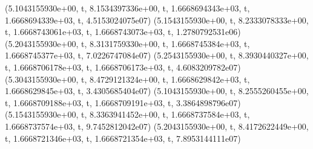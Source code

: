 \documentclass[letterpaper,10pt,english]{sphinxmanual}
\begin{document}
\begin{sphinxVerbatim}[commandchars=\\\{\}]
(\PYGZsq{}5.1043155930e+00\PYGZsq{}, \PYGZsq{}\PYGZbs{}t\PYGZsq{}, \PYGZsq{}8.1534397336e+00\PYGZsq{}, \PYGZsq{}\PYGZbs{}t\PYGZsq{}, \PYGZsq{}\PYGZhy{}1.6668694343e+03\PYGZsq{}, \PYGZsq{}\PYGZbs{}t\PYGZsq{}, \PYGZsq{}\PYGZhy{}1.6668694339e+03\PYGZsq{}, \PYGZsq{}\PYGZbs{}t\PYGZsq{}, \PYGZsq{}\PYGZhy{}4.5153024075e\PYGZhy{}07\PYGZsq{})
(\PYGZsq{}5.1543155930e+00\PYGZsq{}, \PYGZsq{}\PYGZbs{}t\PYGZsq{}, \PYGZsq{}8.2333078333e+00\PYGZsq{}, \PYGZsq{}\PYGZbs{}t\PYGZsq{}, \PYGZsq{}\PYGZhy{}1.6668743061e+03\PYGZsq{}, \PYGZsq{}\PYGZbs{}t\PYGZsq{}, \PYGZsq{}\PYGZhy{}1.6668743073e+03\PYGZsq{}, \PYGZsq{}\PYGZbs{}t\PYGZsq{}, \PYGZsq{}1.2780792531e\PYGZhy{}06\PYGZsq{})
(\PYGZsq{}5.2043155930e+00\PYGZsq{}, \PYGZsq{}\PYGZbs{}t\PYGZsq{}, \PYGZsq{}8.3131759330e+00\PYGZsq{}, \PYGZsq{}\PYGZbs{}t\PYGZsq{}, \PYGZsq{}\PYGZhy{}1.6668745384e+03\PYGZsq{}, \PYGZsq{}\PYGZbs{}t\PYGZsq{}, \PYGZsq{}\PYGZhy{}1.6668745377e+03\PYGZsq{}, \PYGZsq{}\PYGZbs{}t\PYGZsq{}, \PYGZsq{}\PYGZhy{}7.0226747084e\PYGZhy{}07\PYGZsq{})
(\PYGZsq{}5.2543155930e+00\PYGZsq{}, \PYGZsq{}\PYGZbs{}t\PYGZsq{}, \PYGZsq{}8.3930440327e+00\PYGZsq{}, \PYGZsq{}\PYGZbs{}t\PYGZsq{}, \PYGZsq{}\PYGZhy{}1.6668706178e+03\PYGZsq{}, \PYGZsq{}\PYGZbs{}t\PYGZsq{}, \PYGZsq{}\PYGZhy{}1.6668706173e+03\PYGZsq{}, \PYGZsq{}\PYGZbs{}t\PYGZsq{}, \PYGZsq{}\PYGZhy{}4.6083209782e\PYGZhy{}07\PYGZsq{})
(\PYGZsq{}5.3043155930e+00\PYGZsq{}, \PYGZsq{}\PYGZbs{}t\PYGZsq{}, \PYGZsq{}8.4729121324e+00\PYGZsq{}, \PYGZsq{}\PYGZbs{}t\PYGZsq{}, \PYGZsq{}\PYGZhy{}1.6668629842e+03\PYGZsq{}, \PYGZsq{}\PYGZbs{}t\PYGZsq{}, \PYGZsq{}\PYGZhy{}1.6668629845e+03\PYGZsq{}, \PYGZsq{}\PYGZbs{}t\PYGZsq{}, \PYGZsq{}3.4305685404e\PYGZhy{}07\PYGZsq{})
(\PYGZsq{}5.1043155930e+00\PYGZsq{}, \PYGZsq{}\PYGZbs{}t\PYGZsq{}, \PYGZsq{}8.2555260455e+00\PYGZsq{}, \PYGZsq{}\PYGZbs{}t\PYGZsq{}, \PYGZsq{}\PYGZhy{}1.6668709188e+03\PYGZsq{}, \PYGZsq{}\PYGZbs{}t\PYGZsq{}, \PYGZsq{}\PYGZhy{}1.6668709191e+03\PYGZsq{}, \PYGZsq{}\PYGZbs{}t\PYGZsq{}, \PYGZsq{}3.3864898796e\PYGZhy{}07\PYGZsq{})
(\PYGZsq{}5.1543155930e+00\PYGZsq{}, \PYGZsq{}\PYGZbs{}t\PYGZsq{}, \PYGZsq{}8.3363941452e+00\PYGZsq{}, \PYGZsq{}\PYGZbs{}t\PYGZsq{}, \PYGZsq{}\PYGZhy{}1.6668737584e+03\PYGZsq{}, \PYGZsq{}\PYGZbs{}t\PYGZsq{}, \PYGZsq{}\PYGZhy{}1.6668737574e+03\PYGZsq{}, \PYGZsq{}\PYGZbs{}t\PYGZsq{}, \PYGZsq{}\PYGZhy{}9.7452812042e\PYGZhy{}07\PYGZsq{})
(\PYGZsq{}5.2043155930e+00\PYGZsq{}, \PYGZsq{}\PYGZbs{}t\PYGZsq{}, \PYGZsq{}8.4172622449e+00\PYGZsq{}, \PYGZsq{}\PYGZbs{}t\PYGZsq{}, \PYGZsq{}\PYGZhy{}1.6668721346e+03\PYGZsq{}, \PYGZsq{}\PYGZbs{}t\PYGZsq{}, \PYGZsq{}\PYGZhy{}1.6668721354e+03\PYGZsq{}, \PYGZsq{}\PYGZbs{}t\PYGZsq{}, \PYGZsq{}7.8953144111e\PYGZhy{}07\PYGZsq{})

\end{sphinxVerbatim}
\end{document}
